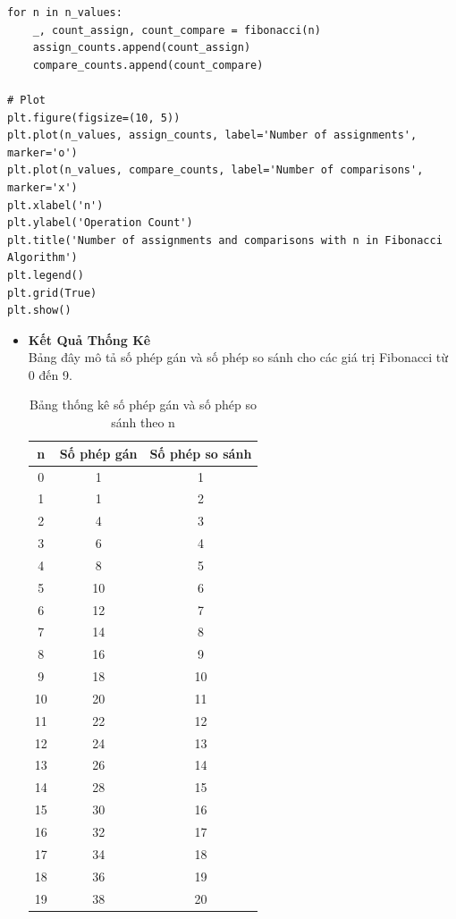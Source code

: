 \documentclass[12pt,a4paper]{article}
\begin{document}
\begin{enumerate}[label=\textbf{Câu 2:} ]
\begin{enumerate}[label=\textbf{Câu 3:} ]
\begin{enumerate}[label=\alph*)]
\begin{lstlisting}
for n in n_values:
    _, count_assign, count_compare = fibonacci(n)
    assign_counts.append(count_assign)
    compare_counts.append(count_compare)

# Plot
plt.figure(figsize=(10, 5))
plt.plot(n_values, assign_counts, label='Number of assignments', marker='o')
plt.plot(n_values, compare_counts, label='Number of comparisons', marker='x')
plt.xlabel('n')
plt.ylabel('Operation Count')
plt.title('Number of assignments and comparisons with n in Fibonacci Algorithm')
plt.legend()
plt.grid(True)
plt.show()
\end{lstlisting}
\begin{itemize}
    \item \textbf{Kết Quả Thống Kê}\\
    Bảng đây mô tả số phép gán và số phép so sánh cho các giá trị Fibonacci từ 0 đến 9.
\begin{table}[h!]
    \centering
    \begin{tabular}{|c|c|c|}
        \hline
        \textbf{n} & \textbf{Số phép gán} & \textbf{Số phép so sánh} \\
        \hline
        0 & 1 & 1 \\
        1 & 1 & 2 \\
        2 & 4 & 3 \\
        3 & 6 & 4 \\
        4 & 8 & 5 \\
        5 & 10 & 6 \\
        6 & 12 & 7 \\
        7 & 14 & 8 \\
        8 & 16 & 9 \\
        9 & 18 & 10 \\
        10 & 20 & 11 \\
        11 & 22 & 12 \\
        12 & 24 & 13 \\
        13 & 26 & 14 \\
        14 & 28 & 15 \\
        15 & 30 & 16 \\
        16 & 32 & 17 \\
        17 & 34 & 18 \\
        18 & 36 & 19 \\
        19 & 38 & 20 \\
        \hline
    \end{tabular}
    \caption{Bảng thống kê số phép gán và số phép so sánh theo n}
\end{table}
\newpage


\end{itemize}
\end{enumerate}
\end{enumerate}
\end{enumerate}
\end{document}
